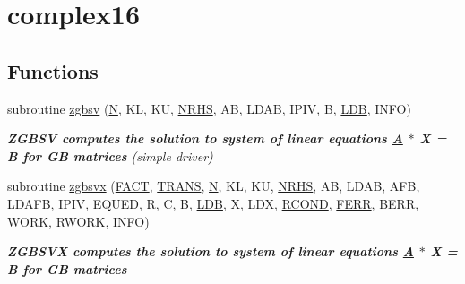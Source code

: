 \hypertarget{group__complex16GBsolve}{}\section{complex16}
\label{group__complex16GBsolve}
\subsection*{Functions}
\begin{DoxyCompactItemize}
\item 
subroutine \hyperlink{group__complex16GBsolve_ga908abc0aad64131b9a32edb08510eb00}{zgbsv} (\hyperlink{polmisc_8c_a0240ac851181b84ac374872dc5434ee4}{N}, K\+L, K\+U, \hyperlink{example__user_8c_aa0138da002ce2a90360df2f521eb3198}{N\+R\+H\+S}, A\+B, L\+D\+A\+B, I\+P\+I\+V, B, \hyperlink{example__user_8c_a50e90a7104df172b5a89a06c47fcca04}{L\+D\+B}, I\+N\+F\+O)
\begin{DoxyCompactList}\small\item\em {\bfseries  Z\+G\+B\+S\+V computes the solution to system of linear equations \hyperlink{classA}{A} $\ast$ X = B for G\+B matrices} (simple driver) \end{DoxyCompactList}\item 
subroutine \hyperlink{group__complex16GBsolve_ga64dec51ad6dacf882bf2d335ca583aa0}{zgbsvx} (\hyperlink{superlu__enum__consts_8h_af00a42ecad444bbda75cde1b64bd7e72a1b6692b56d378abb85bd49063721d034}{F\+A\+C\+T}, \hyperlink{superlu__enum__consts_8h_a0c4e17b2d5cea33f9991ccc6a6678d62a1f61e3015bfe0f0c2c3fda4c5a0cdf58}{T\+R\+A\+N\+S}, \hyperlink{polmisc_8c_a0240ac851181b84ac374872dc5434ee4}{N}, K\+L, K\+U, \hyperlink{example__user_8c_aa0138da002ce2a90360df2f521eb3198}{N\+R\+H\+S}, A\+B, L\+D\+A\+B, A\+F\+B, L\+D\+A\+F\+B, I\+P\+I\+V, E\+Q\+U\+E\+D, R, C, B, \hyperlink{example__user_8c_a50e90a7104df172b5a89a06c47fcca04}{L\+D\+B}, X, L\+D\+X, \hyperlink{superlu__enum__consts_8h_af00a42ecad444bbda75cde1b64bd7e72a9b5c151728d8512307565994c89919d5}{R\+C\+O\+N\+D}, \hyperlink{superlu__enum__consts_8h_af00a42ecad444bbda75cde1b64bd7e72a78fd14d7abebae04095cfbe02928f153}{F\+E\+R\+R}, B\+E\+R\+R, W\+O\+R\+K, R\+W\+O\+R\+K, I\+N\+F\+O)
\begin{DoxyCompactList}\small\item\em {\bfseries  Z\+G\+B\+S\+V\+X computes the solution to system of linear equations \hyperlink{classA}{A} $\ast$ X = B for G\+B matrices} \end{DoxyCompactList}\item 

\end{DoxyCompactItemize}

